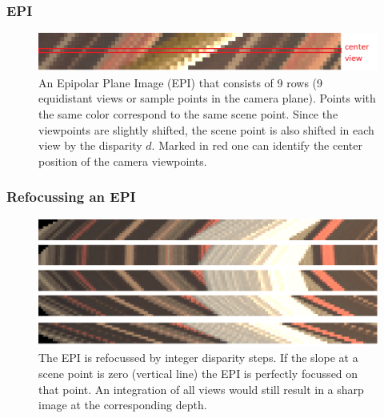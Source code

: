 \documentclass[11pt]{beamer}
\begin{document}
\begin{frame}
	\frametitle{EPI}
	\begin{figure}
		\centering
		\includegraphics[width=1\linewidth]{images/simple_epi}
		\caption[Example Epipolar Plane image]{An Epipolar Plane Image (EPI) that consists of 9 rows (9 equidistant views or sample points in the camera plane). Points with the same color correspond to the same scene point. Since the viewpoints are slightly shifted, the scene point is also shifted in each view by the disparity $d$. Marked in red one can identify the center position of the camera viewpoints.}
		\label{fig:simpleepi}
	\end{figure}
\end{frame}
\begin{frame}
\frametitle{Refocussing an EPI}
\begin{figure}
	\centering
	\includegraphics[width=0.7\linewidth]{images/refocused_cut}
	\caption[Refocussed EPI]{The EPI is refocussed by integer disparity steps. If the slope at a scene point is zero (vertical line) the EPI is perfectly focussed on that point. An integration of all views would still result in a sharp image at the corresponding depth.}
	\label{fig:refocusedcut}
\end{figure}
\end{frame}
\end{document}
